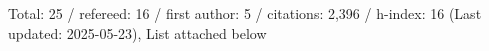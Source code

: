 Total: 25 / refereed: 16 / first author: 5 / citations: 2,396 / h-index: 16 (Last updated: 2025-05-23), List attached below